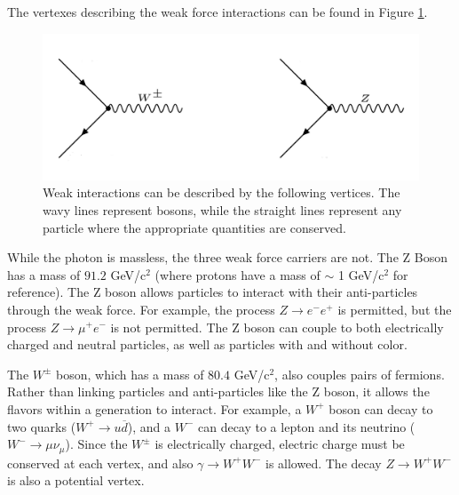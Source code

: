 The vertexes describing the weak force interactions can be found in Figure \ref{Fig:Intro:Vertex3}.
\begin{figure}[h]
    \centering
        \includegraphics[width=\textwidth]{F1/Vertex3}
        \caption{Weak interactions can be described by the following vertices. The wavy lines represent bosons, while the straight lines represent any particle where the appropriate quantities are conserved.}
        \label{Fig:Intro:Vertex3}
\end{figure}
While the photon is massless, the three weak force carriers are not. The Z Boson has a mass of $91.2$ GeV/c$^2$ (where  protons have a mass of $\sim$ 1 GeV/c$^2$ for reference). The Z boson allows particles to interact with their anti-particles through the weak force. For example, the process $Z\rightarrow e^-e^+$ is permitted, but the process $Z\rightarrow\mu^+e^-$ is not permitted. The Z boson can couple to both electrically charged and neutral particles, as well as particles with and without color.

The $W^\pm$ boson, which has a mass of $80.4$ GeV/c$^2$, also couples pairs of fermions. Rather than linking particles and anti-particles like the Z boson, it allows the flavors within a generation to interact. For example, a $W^{+}$ boson can decay to two quarks ($W^{+}\rightarrow u\overline{d}$), and a $W^{-}$ can decay to a lepton and its neutrino ($W^{-}\rightarrow\mu\nu_\mu$). Since the $W^{\pm}$ is electrically charged, electric charge must be conserved at each vertex, and also $\gamma\rightarrow W^+W^-$ is allowed. The decay $Z\rightarrow W^+W^-$ is also a potential vertex.


